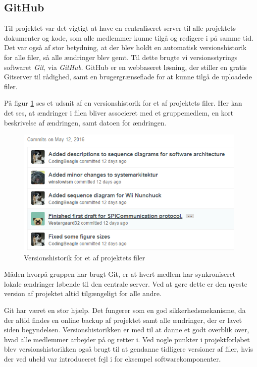 \subsection{GitHub}
Til projektet var det vigtigt at have en centraliseret server til alle projektets dokumenter og kode, som alle medlemmer kunne tilgå og redigere i på samme tid. Det var også af stor betydning, at der blev holdt en automatisk versionshistorik for alle filer, så alle ændringer blev gemt. Til dette brugte vi versionsstyrings softwaret \textit{Git}, via \textit{GitHub}. GitHub er en webbaseret løsning, der stiller en gratis Gitserver til rådighed, samt en brugergrænseflade for at kunne tilgå de uploadede filer. \newline

\noindent På figur \ref{ref:GitHubHistorik} ses et udsnit af en versionshistorik for et af projektets filer. Her kan det ses, at ændringer i filen bliver associeret med et gruppemedlem, en kort beskrivelse af ændringen, samt datoen for ændringen.

\begin{figure}[H]
	\centering
	\includegraphics[width=\textwidth]{Projektgennemfoerelse/images/GitHubHistorik}
	\caption{Versionshistorik for et af projektets filer}
	\label{ref:GitHubHistorik}
\end{figure}

\noindent Måden hvorpå gruppen har brugt Git, er at hvert medlem har synkroniseret lokale ændringer løbende til den centrale server. Ved at gøre dette er den nyeste version af projektet altid tilgængeligt for alle andre. \newline

\noindent Git har været en stor hjælp. Det fungerer som en god sikkerhedsmekanisme, da der altid findes en online backup af projektet samt alle ændringer, der er lavet siden begyndelsen. Versionshistorikken er med til at danne et godt overblik over, hvad alle medlemmer arbejder på og retter i. Ved nogle punkter i projektforløbet blev versionshistorikken også brugt til at gendanne tidligere versioner af filer, hvis der ved uheld var introduceret fejl i for eksempel softwarekomponenter. \newline

